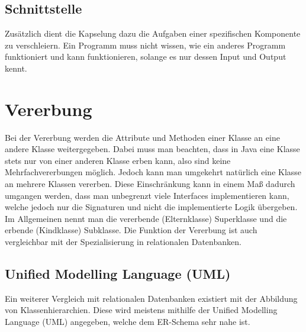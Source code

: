\documentclass{article}
\begin{document}
	\subsection{Schnittstelle}
	Zusätzlich dient die Kapselung dazu die Aufgaben einer spezifischen Komponente zu verschleiern. Ein Programm muss nicht wissen, wie ein anderes Programm funktioniert und kann funktionieren, solange es nur dessen Input und Output kennt.
	\section{Vererbung}
	Bei der Vererbung werden die Attribute und Methoden einer Klasse an eine andere Klasse weitergegeben. Dabei muss man beachten, dass in Java eine Klasse stets nur von einer anderen Klasse erben kann, also sind keine Mehrfachvererbungen möglich. Jedoch kann man umgekehrt natürlich eine Klasse an mehrere Klassen vererben. Diese Einschränkung kann in einem Maß dadurch umgangen werden, dass man unbegrenzt viele Interfaces implementieren kann, welche jedoch nur die Signaturen und nicht die implementierte Logik übergeben. \\
	Im Allgemeinen nennt man die vererbende (Elternklasse) Superklasse und die erbende (Kindklasse) Subklasse. Die Funktion der Vererbung ist auch vergleichbar mit der Spezialisierung in relationalen Datenbanken.
	\subsection{Unified Modelling Language (UML)}
	Ein weiterer Vergleich mit relationalen Datenbanken existiert mit der Abbildung von Klassenhierarchien. Diese wird meistens mithilfe der Unified Modelling Language (UML) angegeben, welche dem ER-Schema sehr nahe ist.
\end{document}
